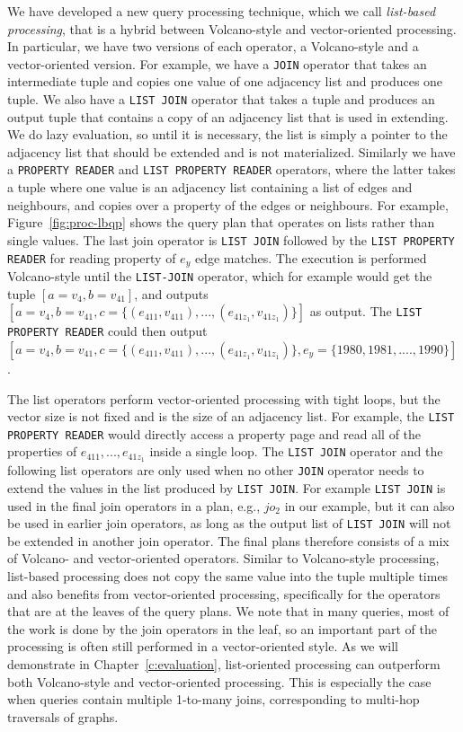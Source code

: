 We have developed a new query processing technique, which we call {\em list-based processing}, that is a hybrid between Volcano-style and vector-oriented processing. In particular, we have two versions of each operator, a Volcano-style and a vector-oriented version. For example, we have a \texttt{JOIN} operator that takes an intermediate tuple and copies one value of one adjacency list and produces one tuple. We also have a \texttt{LIST JOIN} operator that takes a tuple and produces an output tuple that contains a copy of an adjacency list that is used in extending. We do lazy evaluation, so until it is necessary, the list is simply a pointer to the adjacency list that should be extended and is not materialized. Similarly we have a \texttt{PROPERTY READER} and \texttt{LIST PROPERTY READER} operators, where the latter takes a tuple where one value is an adjacency list containing a list of edges and neighbours, and copies over a property of the edges or neighbours. For example, Figure~\ref{fig:proc-lbqp} shows the query plan that operates on lists rather than single values. The last join operator is \texttt{LIST JOIN} followed by the \texttt{LIST PROPERTY READER} for reading property of $e_y$ edge matches. The execution is performed Volcano-style until the \texttt{LIST-JOIN} operator, which for example would get the tuple $[a=v_4, b=v_{41}]$, and outputs $[a=v_4, b=v_{41}, c=\{(e_{411}, v_{411}), ..., (e_{41z_1}, v_{41z_1})\}]$ as output. The \texttt{LIST PROPERTY READER} could then output $[a=v_4, b=v_{41}, c=\{(e_{411}, v_{411}), ..., (e_{41z_1}, v_{41z_1})\}, e_y=\{1980, 1981, ...., 1990\}]$. 

The list operators perform vector-oriented processing with tight loops, but the vector size is not fixed and is the size of an adjacency list. For example, the \texttt{LIST PROPERTY READER} would directly access a property page and read all of the properties of $e_{411}, ..., e_{41z_1}$ inside a single loop. The \texttt{LIST JOIN} operator and the following list operators are only used when no other \texttt{JOIN} operator needs to extend the values in the list produced by \texttt{LIST JOIN}. For example \texttt{LIST JOIN} is used in the final join operators in a plan, e.g., $jo_2$ in our example, but it can also be used in earlier join operators, as long as the output list of \texttt{LIST JOIN} will not be extended in another join operator. The final plans therefore consists of a mix of Volcano- and vector-oriented operators. Similar to Volcano-style processing, list-based processing does not copy the same value into the tuple multiple times and also benefits from vector-oriented processing, specifically for the operators that are at the leaves of the query plans. We note that in many queries, most of the work is done by the join operators in the leaf, so an important part of the processing is often still performed in a vector-oriented style. As we will demonstrate in Chapter~\ref{c:evaluation}, list-oriented processing can outperform both Volcano-style and vector-oriented processing. This is especially the case when queries contain multiple 1-to-many joins, corresponding to multi-hop traversals of graphs.

